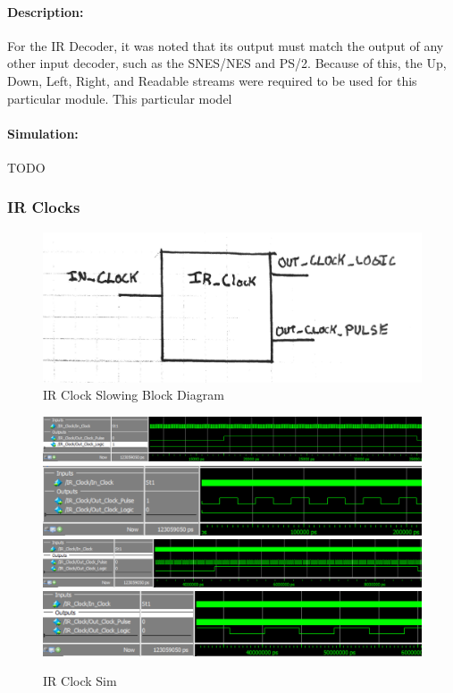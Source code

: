 \documentclass[]{article}
\begin{document}
\paragraph{Description:} For the IR Decoder, it was noted that its output must match the output of any other input decoder, such as the SNES/NES and PS/2.
Because of this, the Up, Down, Left, Right, and Readable streams were required to be used for this particular module. This particular model 
\paragraph{Simulation:} TODO

\subsubsection{IR Clocks}
\begin{figure}[H]\centering
    \includegraphics[width=0.9\linewidth]{figures/IR_Clock_Block.jpg}
    \caption{IR Clock Slowing Block Diagram}
    \label{fig:irClockBlock}
\end{figure}
\begin{figure}[H]\centering
    \includegraphics[width=\linewidth]{figures/IR_Clock_Sim1}
    \includegraphics[width=\linewidth]{figures/IR_Clock_Sim2}
    \includegraphics[width=\linewidth]{figures/IR_Clock_Sim3}
    \includegraphics[width=\linewidth]{figures/IR_Clock_Sim4}
    \caption{IR Clock Sim}
    \label{fig:asyncIRData}
\end{figure}
\end{document}
